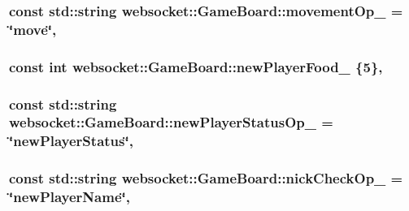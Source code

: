 \subsubsection[{\texorpdfstring{movement\+Op\+\_\+}{movementOp_}}]{\setlength{\rightskip}{0pt plus 5cm}const std\+::string websocket\+::\+Game\+Board\+::movement\+Op\+\_\+ = \char`\"{}move\char`\"{}\hspace{0.3cm}{\ttfamily [static]}, {\ttfamily [private]}}\hypertarget{classwebsocket_1_1GameBoard_ac5eba2bf19bde163ea767906c8e2c61c}{}\label{classwebsocket_1_1GameBoard_ac5eba2bf19bde163ea767906c8e2c61c}
\subsubsection[{\texorpdfstring{new\+Player\+Food\+\_\+}{newPlayerFood_}}]{\setlength{\rightskip}{0pt plus 5cm}const int websocket\+::\+Game\+Board\+::new\+Player\+Food\+\_\+ \{5\}\hspace{0.3cm}{\ttfamily [static]}, {\ttfamily [private]}}\hypertarget{classwebsocket_1_1GameBoard_aad2445e5c98fe42f37e71c15ca3c57c9}{}\label{classwebsocket_1_1GameBoard_aad2445e5c98fe42f37e71c15ca3c57c9}
\subsubsection[{\texorpdfstring{new\+Player\+Status\+Op\+\_\+}{newPlayerStatusOp_}}]{\setlength{\rightskip}{0pt plus 5cm}const std\+::string websocket\+::\+Game\+Board\+::new\+Player\+Status\+Op\+\_\+ = \char`\"{}new\+Player\+Status\char`\"{}\hspace{0.3cm}{\ttfamily [static]}, {\ttfamily [private]}}\hypertarget{classwebsocket_1_1GameBoard_af28eae4479ca907c062495b7ec2925c1}{}\label{classwebsocket_1_1GameBoard_af28eae4479ca907c062495b7ec2925c1}
\subsubsection[{\texorpdfstring{nick\+Check\+Op\+\_\+}{nickCheckOp_}}]{\setlength{\rightskip}{0pt plus 5cm}const std\+::string websocket\+::\+Game\+Board\+::nick\+Check\+Op\+\_\+ = \char`\"{}new\+Player\+Name\char`\"{}\hspace{0.3cm}{\ttfamily [static]}, {\ttfamily [private]}}\hypertarget{classwebsocket_1_1GameBoard_a55afbbb9d15f4815427d2f20ca6674cd}{}\label{classwebsocket_1_1GameBoard_a55afbbb9d15f4815427d2f20ca6674cd}
